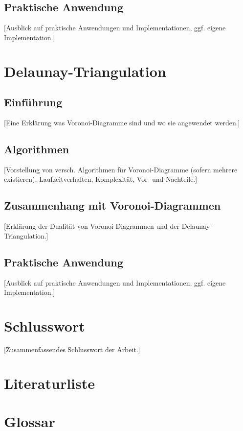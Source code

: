 \documentclass[pdftex,12pt,a4paper]{article}
\begin{document}
\subsection{Praktische Anwendung}
[Ausblick auf praktische Anwendungen und Implementationen, ggf. eigene Implementation.]

\newpage

\section{Delaunay-Triangulation}

\subsection{Einführung}
[Eine Erklärung was Voronoi-Diagramme sind und wo sie angewendet werden.]

\subsection{Algorithmen}
[Vorstellung von versch. Algorithmen für Voronoi-Diagramme (sofern mehrere existieren), Laufzeitverhalten, Komplexität, Vor- und Nachteile.]

\subsection{Zusammenhang mit Voronoi-Diagrammen}
[Erklärung der Dualität von Voronoi-Diagrammen und der Delaunay-Triangulation.]

\subsection{Praktische Anwendung}
[Ausblick auf praktische Anwendungen und Implementationen, ggf. eigene Implementation.]

\newpage

\section{Schlusswort}
[Zusammenfassendes Schlusswort der Arbeit.]

\newpage

\section{Literaturliste}
\printbibliography

\newpage

\section{Glossar}
\printglossary[numberedsection]
\end{document}
